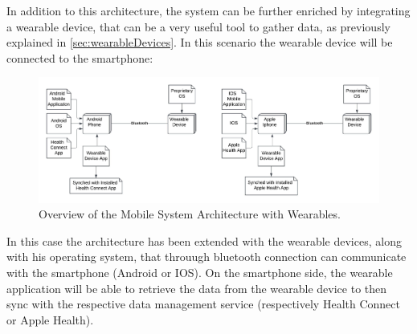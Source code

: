 \noindent In addition to this architecture, the system can be further enriched by integrating a wearable device, that can be a very useful tool to gather data, as previously explained in \cref{sec:wearableDevices}. In this scenario the wearable device will be connected to the smartphone:

\begin{figure}
    \includegraphics[width=1.0\linewidth]{./images/system_architecture_wearable.jpeg}
    \caption{Overview of the Mobile System Architecture with Wearables.}
    \label{fig:systemArchitectureWearables}
\end{figure}

\noindent In this case the architecture has been extended with the wearable devices, along with his operating system, that throuugh bluetooth connection can communicate with the smartphone (Android or IOS). On the smartphone side, the wearable application will be able to retrieve the data from the wearable device to then sync with the respective data management service (respectively Health Connect or Apple Health).
